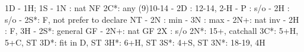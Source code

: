 1D - 1H; 1S -
1N : nat NF
2C*: any (9)10-14
   - 2D : 12-14, 2-H
        - P  : s/o
        - 2H : s/o
        - 2S*: F, not prefer to declare NT
             - 2N : min
             - 3N : max
        - 2N+: nat inv
   - 2H : F, 3H
   - 2S*: general GF
   - 2N+: nat GF
2X : s/o
2N*: 15+, catchall
3C*: 5+H, 5+C, ST
3D*: fit in D, ST
3H*: 6+H, ST
3S*: 4+S, ST
3N*: 18-19, 4H
